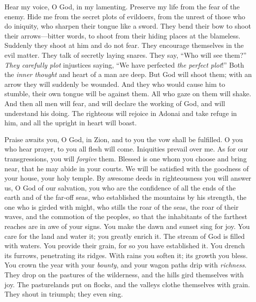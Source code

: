 \begin{biblechapter} %
 Hear my voice, O God, in my lamenting. 
Preserve my life from the fear of the enemy.
\verse Hide me from the secret plots of evildoers, 
from the unrest of those who do iniquity,
\verse who sharpen their tongue like a sword. 
They bend their bow to shoot their arrows—bitter words,
\verse to shoot from their hiding places at the blameless. 
Suddenly they shoot at him and do not fear.
\verse They encourage themselves in the evil matter. 
They talk of secretly laying snares. 
They say, “Who will see them?”
\verse \textit{They carefully plot} injustices saying, 
“We have perfected \textit{the perfect plot}!” 
Both the \textit{inner thought} and heart of a man are deep.
\verse But God will shoot them; 
with an arrow they will suddenly be wounded.
\verse  And they who would cause him to stumble, 
their own tongue will be against them. 
All who gaze on them will shake.
\verse And then all men will fear, 
and will declare the working of God, 
and will understand his doing.
\verse The righteous will rejoice in Adonai and take refuge in him, 
and all the upright in heart will boast.
\end{biblechapter}

\begin{biblechapter} %
 Praise awaits you, O God, in Zion, 
and to you the vow shall be fulfilled.
\verse O you who hear prayer, 
to you all flesh will come.
\verse Iniquities prevail over me. 
As for our transgressions, you will \textit{forgive} them.
\verse Blessed is one whom you choose and bring near, 
that he may abide in your courts. 
We will be satisfied with the goodness of your house, 
your holy temple.
\verse By awesome deeds in righteousness you will answer us, 
O God of our salvation, 
you who are the confidence of all the ends of the earth 
and of the far-off seas,
\verse who established the mountains by his strength, 
the one who is girded with might,
\verse who stills the roar of the seas, 
the roar of their waves, 
and the commotion of the peoples,
\verse so that the inhabitants of the farthest reaches are in awe of your signs. 
You make the dawn and sunset sing for joy.
\verse You care for the land and water it; 
you greatly enrich it. 
The stream of God is filled with waters. 
You provide their grain, 
for so you have established it.
\verse You drench its furrows, 
penetrating its ridges. 
With rains you soften it; 
its growth you bless.
\verse You crown the year with your \textit{bounty}, 
and your wagon paths drip with \textit{richness}.
\verse They drop on the pastures of the wilderness, 
and the hills gird themselves with joy.
\verse The pasturelands put on flocks, 
and the valleys clothe themselves with grain. 
They shout in triumph; 
they even sing.
\end{biblechapter}

